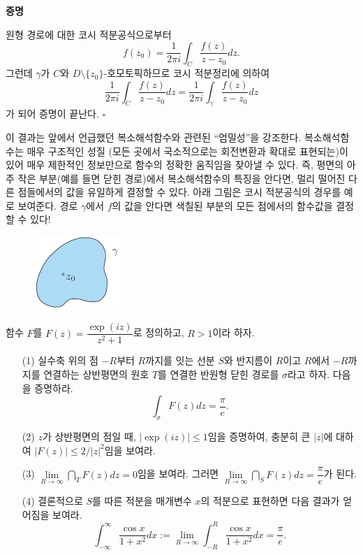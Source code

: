 {\bf 증명}

원형 경로에 대한 코시 적분공식으로부터
\[
f(z_0) = \dfrac1{2\pi i}\int_C \dfrac{f(z)}{z-z_0}dz.
\]
그런데 $\gamma$가 $C$와 $D\setminus \{z_0\}$-호모토픽하므로
코시 적분정리에 의하여
\[
\dfrac1{2\pi i}\int_C \dfrac{f(z)}{z-z_0}dz = \dfrac1{2\pi i}\int_\gamma \dfrac{f(z)}{z-z_0}dz
\]
가 되어 증명이 끝난다. \hfill $\square$

이 결과는 앞에서 언급했던  복소해석함수와 관련된 ``엄밀성''을 강조한다.
복소해석함수는 매우 구조적인 성질 (모든 곳에서 국소적으로는 회전변환과 확대로 표현되는)이 있어
매우 제한적인 정보만으로 함수의 정확한 움직임을 찾아낼 수 있다.
즉, 평면의 아주 작은 부분(예를 들면 닫힌 경로)에서 복소해석함수의 특징을 안다면,
멀리 떨어진 다른 점들에서의 값을 유일하게 결정할 수 있다.
아래 그림은 코시 적분공식의 경우를 예로 보여준다.
경로 $\gamma$에서 $f$의 값을 안다면 색칠된 부분의 모든 점에서의 함수값을 결정할 수 있다!
\begin{figure}[h!]
\begin{center}
\includegraphics[width=0.3\textwidth]{./SaltChapter/figs/fig-3-0-10}
\end{center}
\end{figure}

\begin{salt_exercise} \label{ex-3-27}
함수 $F$를 $F(z) = \dfrac{\exp(iz)}{z^2+1}$로 정의하고, $R>1$이라 하자.
\begin{itemize}
\item[(1)]
실수축 위의 점 $-R$부터 $R$까지를 잇는 선분 $S$와
반지름이 $R$이고 $R$에서 $-R$까지를 연결하는 상반평면의 원호 $T$를 연결한 
반원형 닫힌 경로를 $\sigma$라고 하자.
다음을 증명하라.
\[
\int_\sigma F(z)dz = \dfrac\pi e.
\]
\item[(2)] $z$가 상반평면의 점일 때, $|\exp(iz)|\le 1$임을 증명하여,
충분히 큰 $|z|$에 대하여 $|F(z)| \le 2/|z|^2$임을 보여라.
\item[(3)] $\lim\limits_{R\to\infty} \dint_T F(z)dz = 0$임을 보여라.
그러면 $\lim\limits_{R\to\infty} \dint_S F(z)dz = \dfrac\pi e$가 된다.
\item[(4)] 결론적으로 $S$를 따른 적분을 매개변수 $x$의 적분으로 표현하면 다음 결과가 얻어짐을 보여라.
\[
\int_{-\infty}^\infty \dfrac{\cos x}{1+x^2}dx := 
\lim_{R\to\infty} \int_{-R}^R \dfrac{\cos x}{1+x^2} dx = \dfrac \pi e.
\]
\end{itemize}
\end{salt_exercise}

